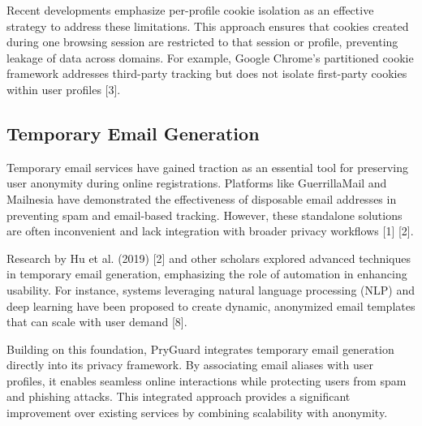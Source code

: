 \documentclass[conference]{IEEEtran}
\begin{document}
Recent developments emphasize per-profile cookie isolation as an effective strategy to address these limitations. This approach ensures that cookies created during one browsing session are restricted to that session or profile, preventing leakage of data across domains. For example, Google Chrome’s partitioned cookie framework addresses third-party tracking but does not isolate first-party cookies within user profiles [3].


\subsection{Temporary Email Generation}
Temporary email services have gained traction as an essential tool for preserving user anonymity during online registrations. Platforms like GuerrillaMail and Mailnesia have demonstrated the effectiveness of disposable email addresses in preventing spam and email-based tracking. However, these standalone solutions are often inconvenient and lack integration with broader privacy workflows [1] [2].

Research by Hu et al. (2019) [2] and other scholars explored advanced techniques in temporary email generation, emphasizing the role of automation in enhancing usability. For instance, systems leveraging natural language processing (NLP) and deep learning have been proposed to create dynamic, anonymized email templates that can scale with user demand [8].

Building on this foundation, PryGuard integrates temporary email generation directly into its privacy framework. By associating email aliases with user profiles, it enables seamless online interactions while protecting users from spam and phishing attacks. This integrated approach provides a significant improvement over existing services by combining scalability with anonymity.





\end{document}
